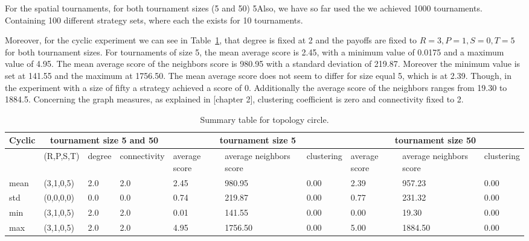 For the spatial tournaments, for both tournament sizes (5 and 50)
5Also, we have so far used the
we achieved 1000 tournaments. Containing 100 different strategy sets, where each
the exists for 10 tournaments.

Moreover, for the cyclic experiment we can see in Table~\ref{sum-cicle}, that degree is
fixed at 2 and the payoffs are fixed to \(R=3, P=1, S=0, T=5\) for both
tournament sizes. For tournaments of size 5, the mean average score
is 2.45, with a minimum value of 0.0175 and a maximum value of 4.95. The
mean average score of the neighbors score is 980.95 with a standard deviation
of 219.87. Moreover the minimum value is set at 141.55 and the maximum at
1756.50. The mean average score does not seem to differ for size equal 5,
which is at 2.39. Though, in the experiment with a size of fifty a strategy
achieved a score of 0. Additionally the average score of the neighbors ranges
from 19.30 to 1884.5. Concerning the graph measures, as explained in [chapter 2],
clustering coefficient is zero and connectivity fixed to 2.

\begin{table}[!hbtp]
\centering
\begin{adjustbox}{width=1\textwidth}
\small
\begin{tabular}{@{}|l|l|l|l|l|l|l|l|l|l|@{}}
\toprule
Cyclic & \multicolumn{3}{c|}{tournament size 5 and 50} & \multicolumn{3}{c|}{tournament size 5} & \multicolumn{3}{c|}{tournament size 50}                             \\\midrule

       & (R,P,S,T) & degree & connectivity & average score & average neighbors score & clustering & average score & average neighbors score & clustering \\\midrule
mean   & (3,1,0,5) & 2.0    & 2.0          & 2.45      & 980.95            & 0.00       & 2.39     & 957.23             & 0.00       \\\midrule
std    & (0,0,0,0) & 0.0    & 0.0          & 0.74      & 219.87             & 0.00       & 0.77    & 231.32              & 0.00       \\\midrule
min    & (3,1,0,5) & 2.0    & 2.0          & 0.01      & 141.55             & 0.00       & 0.00    & 19.30              & 0.00       \\\midrule
max    & (3,1,0,5) & 2.0    & 2.0          & 4.95     & 1756.50             & 0.00       & 5.00    & 1884.50             & 0.00       \\ \bottomrule
\end{tabular}
\end{adjustbox}
\caption{Summary table for topology circle.}
\label{sum-cicle}
\end{table}

